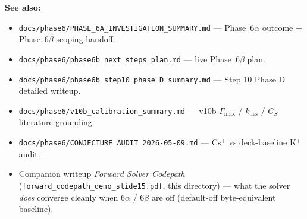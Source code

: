 \documentclass[11pt]{article}
\begin{document}
\vspace{1em}
\noindent\textbf{See also:}
\begin{itemize}\setlength{\itemsep}{1pt}\small
\item \texttt{docs/phase6/PHASE\_6A\_INVESTIGATION\_SUMMARY.md} ---
  Phase~6$\alpha$ outcome + Phase~6$\beta$ scoping handoff.
\item \texttt{docs/phase6/phase6b\_next\_steps\_plan.md} ---
  live Phase~6$\beta$ plan.
\item \texttt{docs/phase6/phase6b\_step10\_phase\_D\_summary.md} ---
  Step 10 Phase D detailed writeup.
\item \texttt{docs/phase6/v10b\_calibration\_summary.md} ---
  v10b $\Gamma_{\mathrm{max}}$ / $k_{\mathrm{des}}$ / $C_S$ literature
  grounding.
\item \texttt{docs/phase6/CONJECTURE\_AUDIT\_2026-05-09.md} ---
  Cs$^+$ vs deck-baseline K$^+$ audit.
\item Companion writeup
  \emph{Forward Solver Codepath}
  (\texttt{forward\_codepath\_demo\_slide15.pdf}, this directory) ---
  what the solver \emph{does} converge cleanly when 6$\alpha$ /
  6$\beta$ are off (default-off byte-equivalent baseline).
\end{itemize}
\end{document}
